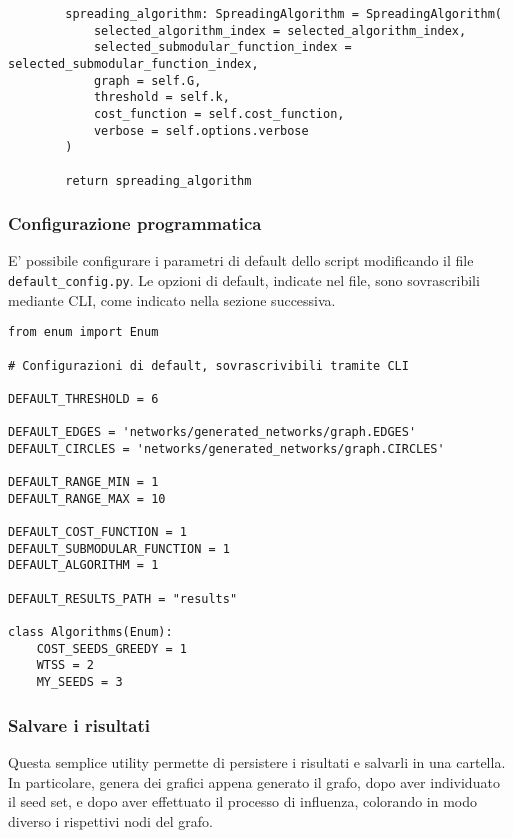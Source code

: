 \begin{code}
\begin{verbatim}
        spreading_algorithm: SpreadingAlgorithm = SpreadingAlgorithm(
            selected_algorithm_index = selected_algorithm_index,
            selected_submodular_function_index = selected_submodular_function_index,
            graph = self.G,
            threshold = self.k,
            cost_function = self.cost_function,
            verbose = self.options.verbose
        )

        return spreading_algorithm
\end{verbatim}
\end{code}

\subsubsection{Configurazione programmatica}

E' possibile configurare i parametri di default dello script modificando il file \texttt{default_config.py}. Le opzioni di default, indicate nel file, sono sovrascribili mediante CLI, come indicato nella sezione successiva.

\begin{code}
\begin{verbatim}
from enum import Enum

# Configurazioni di default, sovrascrivibili tramite CLI

DEFAULT_THRESHOLD = 6

DEFAULT_EDGES = 'networks/generated_networks/graph.EDGES'
DEFAULT_CIRCLES = 'networks/generated_networks/graph.CIRCLES'

DEFAULT_RANGE_MIN = 1
DEFAULT_RANGE_MAX = 10

DEFAULT_COST_FUNCTION = 1
DEFAULT_SUBMODULAR_FUNCTION = 1
DEFAULT_ALGORITHM = 1

DEFAULT_RESULTS_PATH = "results"

class Algorithms(Enum):
    COST_SEEDS_GREEDY = 1
    WTSS = 2
    MY_SEEDS = 3
\end{verbatim}
\end{code}

\subsubsection{Salvare i risultati}

Questa semplice utility permette di persistere i risultati e salvarli in una cartella. In particolare, genera dei grafici appena generato il grafo, dopo aver individuato il seed set, e dopo aver effettuato il processo di influenza, colorando in modo diverso i rispettivi nodi del grafo.

